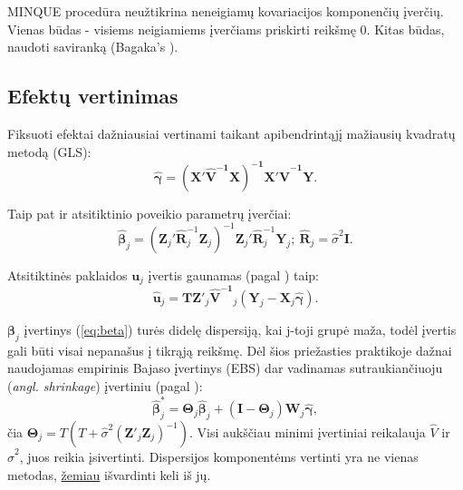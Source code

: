 \documentclass[12pt,a4paper]{article}
\begin{document}
\indent MINQUE procedūra neužtikrina neneigiamų kovariacijos komponenčių įverčių. Vienas būdas - visiems neigiamiems įverčiams priskirti reikšmę 0. Kitas būdas, naudoti saviranką (Bagaka's \cite{bagaka}).


\subsection{Efektų vertinimas}
\indent Fiksuoti efektai dažniausiai vertinami taikant apibendrintąjį mažiausių kvadratų metodą (GLS):
\begin{equation}\label{eq:gamma}
\boldsymbol{\hat{\gamma}}=\mathbf{\left(X'\hat{V}^{-1}X\right)^{-1}X'\hat{V}^{-1}Y}.
\end{equation}

Taip pat ir atsitiktinio poveikio parametrų įverčiai:
\begin{equation} \label{eq:beta}
\boldsymbol{\hat{\beta}}_j=\left(\mathbf{Z}_j'\mathbf{\hat{R}}^{-1}_j\mathbf{Z}_j\right)^{-1}\mathbf{Z}_j'\mathbf{\hat{R}}^{-1}_j\mathbf{Y}_j;\ \mathbf{\hat{R}}_j=\hat{\sigma}^2\mathbf{I}.
\end{equation}

Atsitiktinės paklaidos $\mathbf{u}_j$ įvertis gaunamas (pagal \cite{EBi}) taip:
\begin{equation}
\mathbf{\hat{u}}_j=\mathbf{TZ}'_j\mathbf{\hat{V}^{-1}}_j\left(\mathbf{Y}_j-\mathbf{X}_j\boldsymbol{\hat{\gamma}}\right).
\end{equation}

$\boldsymbol{\beta}_j$ įvertinys (\ref{eq:beta}) turės didelę dispersiją, kai j-toji grupė maža, todėl įvertis gali būti visai nepanašus į tikrąją reikšmę. Dėl šios priežasties praktikoje dažnai naudojamas empirinis Bajaso įvertinys (EBS) dar vadinamas sutraukiančiuoju (\textit{angl. shrinkage}) įvertiniu (pagal \cite{shrinkage}):
\begin{equation}
\boldsymbol{\hat{\beta}}^*_{j}=\boldsymbol{\Theta}_j\boldsymbol{\hat{\beta}}_j+(\boldsymbol{I} - \boldsymbol{\Theta}_j)\mathbf{W}_j\boldsymbol{\hat{\gamma}},
\end{equation}
čia $\mathbf{\Theta}_j=T\left(T+\hat{\sigma}^2(\mathbf{Z}'_j\mathbf{Z}_j)^{-1}\right)$. Visi aukščiau minimi įvertiniai reikalauja $\hat{V}$ ir $\hat{\sigma}^2$, juos reikia įsivertinti. Dispersijos komponentėms vertinti yra ne vienas metodas, \hyperlink{reml}{žemiau} išvardinti keli iš jų.
\end{document}
